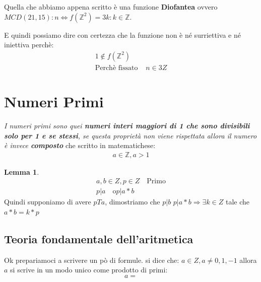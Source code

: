 \documentclass{article}
\theoremstyle{definition}
\newtheorem{lemma}{Lemma}[section]
\begin{document}
Quella che abbiamo appena scritto è una funzione \textbf{Diofantea} ovvero $MCD(21,15) : n \Leftrightarrow f(\mathbb{Z}^{2})={3k : k \in \mathbb{Z}}$. \par

E quindi possiamo dire con certezza che la funzione non è né surriettiva e né iniettiva perchè:
\begin{align*}
        1 \notin f(\mathbb{Z}^{2}) \\
        \textrm{Perchè fissato } & n \in 3Z
\end{align*}









\newpage
\section{Numeri Primi}
\textit{I numeri primi sono quei \textbf{numeri interi maggiori di 1 che sono divisibili solo per 1 e se stessi}, se questa proprietà non viene rispettata allora il numero è invece \textbf{composto}} che scritto in matematichese:
\begin{align}
       a \in \mathbb{Z}, a>1
\end{align}

\begin{lemma}
        
\begin{align}
        a,b \in Z, p \in Z \quad \textrm{Primo} \\
        p | a \quad \textrm{o} p | a*b
\end{align}
Quindi supponiamo di avere $p T a$, dimostriamo che $p|b$
$p | a*b \Rightarrow \exists k \in Z$ tale che $a*b = k*p$
\end{lemma}



\subsection{Teoria fondamentale dell'aritmetica}
Ok prepariamoci a scrivere un pò di formule. \newline
si dice che: $a \in Z, a \not = 0,1,-1$ allora $a$ si scrive in un modo unico come prodotto di primi:
\begin{equation}
a =
\end{equation}
\end{document}
